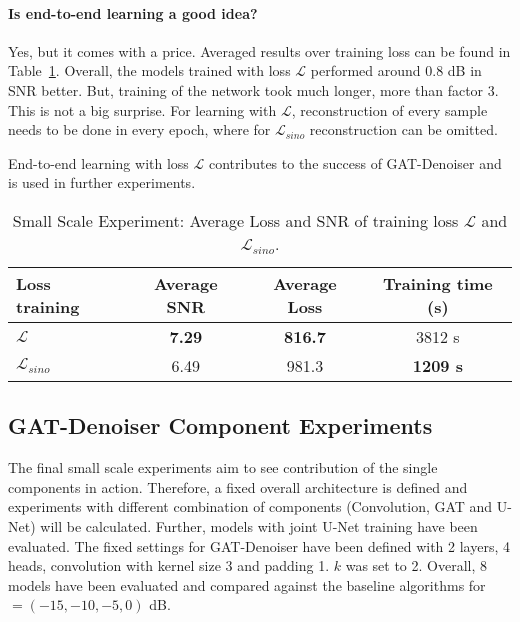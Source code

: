 \paragraph{Is end-to-end learning a good idea?}
Yes, but it comes with a price. 
Averaged results over training loss can be found in Table~\ref{tab:loss_sino_reco}. 
Overall, the models trained with loss $\mathcal{L} $ performed around 0.8 dB in SNR better.
But, training of the network took much longer, more than factor 3. 
This is not a big surprise. For learning with $\mathcal{L} $, reconstruction of every sample
needs to be done in every epoch, where for $\mathcal{L}_{sino}$ reconstruction can be omitted.

\begin{tcolorbox}[colback=red!5!white,colframe=red!75!black]
  End-to-end learning with loss $\mathcal{L} $ contributes to the success of GAT-Denoiser and 
   is used in further experiments.
\end{tcolorbox}


\begin{table}[H]
  \centering
    \begin{tabular}{l|ccc}
    \toprule
    \small \textbf{Loss training} & \small \textbf{Average SNR} & \small \textbf{Average Loss} & \small \textbf{Training time (s)}  \\ 
    \midrule
    $\mathcal{L} $         &  \textbf{7.29}    &  \textbf{816.7}  & 3812 s \\ \hline
    $\mathcal{L}_{sino}$   &  6.49    &  981.3  & \textbf{1209 s} \\ \hline
    \midrule
    \end{tabular}
  \caption{Small Scale Experiment: Average Loss and SNR of training loss $\mathcal{L}$ and $\mathcal{L}_{sino}$.}
  \label{tab:loss_sino_reco}
\end{table}


\subsection{GAT-Denoiser Component Experiments}

The final small scale experiments aim to see contribution of the single components in action.
Therefore, a fixed overall architecture is defined and experiments
with different combination of components (Convolution, GAT and U-Net) will be calculated.
Further, models with joint U-Net training have been evaluated.
The fixed settings for GAT-Denoiser have been defined with 2 layers, 4 heads, convolution with 
kernel size 3 and padding 1. $k$ was set to 2.
Overall, 8 models have been evaluated and compared against the baseline algorithms for  \snry $ = (-15,-10,-5,0) $ dB.

